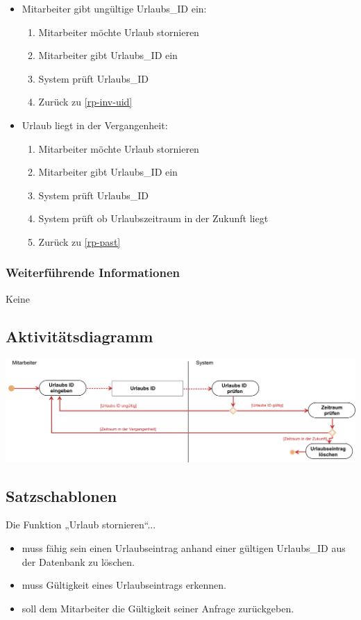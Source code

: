 \begin{itemize}
    \item Mitarbeiter gibt ungültige Urlaubs\_ID ein:
    \begin{enumerate}
    	\item Mitarbeiter möchte Urlaub stornieren
    	\item Mitarbeiter gibt Urlaubs\_ID ein \label{rp-inv-uid}
    	\item System prüft Urlaubs\_ID
    	\item Zurück zu \ref{rp-inv-uid}
    \end{enumerate}
    
    \item Urlaub liegt in der Vergangenheit:
     \begin{enumerate}
    	\item Mitarbeiter möchte Urlaub stornieren
    	\item Mitarbeiter gibt Urlaubs\_ID ein \label{rp-past}
    	\item System prüft Urlaubs\_ID
    	\item System prüft ob Urlaubszeitraum in der Zukunft liegt
    	\item Zurück zu \ref{rp-past}
    \end{enumerate}   
\end{itemize}

\subsubsection{Weiterführende Informationen}
Keine

\subsection{Aktivitätsdiagramm}

\begin{center}
\includegraphics[width=0.9\linewidth]{Urlaub_stornieren.png}
\end{center}

\subsection{Satzschablonen}
Die Funktion „Urlaub stornieren“...
\begin{itemize}
    \item muss fähig sein einen Urlaubseintrag anhand einer gültigen Urlaubs\_ID aus der Datenbank zu löschen.
    \item muss Gültigkeit eines Urlaubseintrags erkennen.
    \item soll dem Mitarbeiter die Gültigkeit seiner Anfrage zurückgeben.
\end{itemize}

